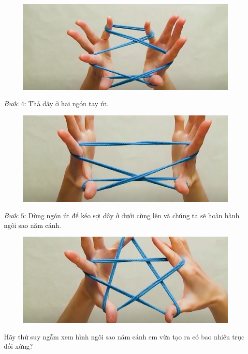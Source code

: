\begin{multicols}{2}
\begin{figure}[H]
		\vspace*{1pt}
		\hspace*{1pt}\includegraphics[width=0.81\linewidth]{3d}
		\vspace*{-10pt}
	\end{figure}
	\textit{Bước} $4$: Thả dây ở hai ngón tay út.
	\begin{figure}[H]
		\vspace*{-5pt}
		\centering
		\captionsetup{labelformat= empty, justification=centering}
		\includegraphics[width= 0.81\linewidth]{4}
		\vspace*{-10pt}
	\end{figure}
	\textit{Bước} $5$: Dùng ngón út để kéo sợi dây ở dưới cùng lên và chúng ta sẽ hoàn hành ngôi sao năm cánh.
	\begin{figure}[H]
		\vspace*{5pt}
		\centering
		\captionsetup{labelformat= empty, justification=centering}
		\includegraphics[width= 0.81\linewidth]{5}
		\vspace*{-5pt}
	\end{figure}
	Hãy thử suy ngẫm xem hình ngôi sao năm cánh em vừa tạo ra có bao nhiêu trục đối xứng?

\end{multicols}
